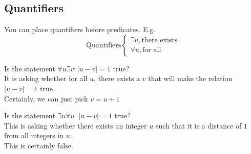 \documentclass[a4paper]{article}
\theoremstyle{plain}
\theoremstyle{definition}
\newtheorem{exmp}{Example}[section]
\theoremstyle{remark}
\begin{document}
\subsection{Quantifiers}
You can place quantifiers before predicates. E.g.
$$
\text{Quantifiers}
\begin{cases}
	\exists u, \text{there exists}\\
	\forall u, \text{for all}
\end{cases}
$$
\begin{tcolorbox}[colback=black!3!white,colframe=black!60!white,title=\begin{exmp}Example 1 \label{Example 1}\end{exmp}]
Is the statement $\forall u \exists v : |u-v|=1$ true?\\
It is asking whether for all $u$, there exists a $v$ that will make the relation $|u-v|=1$ true.\\
Certainly, we can just pick $v=u+1$
\end{tcolorbox}
\begin{tcolorbox}[colback=black!3!white,colframe=black!60!white,title=\begin{exmp}Exampel 2 \label{Example 2}\end{exmp}]
Is the statement $\exists u \forall u \; \; |u-v|=1$ true?\\
This is asking whether there exists an integer $u$ such that it is a distance of $1$ from all integers in $u$. \\
This is certainly false.
\end{tcolorbox}
\end{document}
